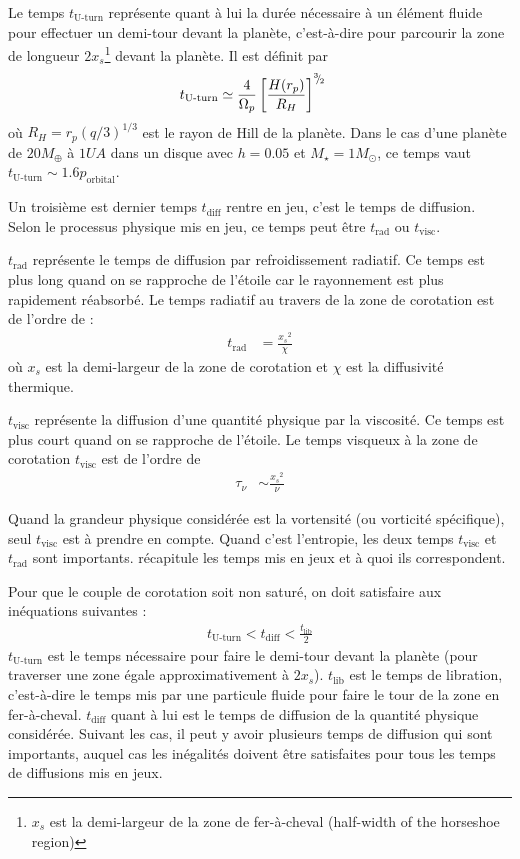 Le temps $t_\text{U-turn}$ représente quant à lui la durée nécessaire à un élément fluide pour effectuer un demi-tour devant la planète, c'est-à-dire pour parcourir la zone de longueur $2x_s$\footnote{$x_s$ est la demi-largeur de la zone de fer-à-cheval (\og half-width of the horseshoe region\fg)} devant la planète. Il est définit par \citep[eq. (64)]{baruteau2008corotation}
\begin{align}
t_\text{U-turn} &\simeq \frac{4}{\Omega_p}\left[\frac{H(r_p)}{R_H}\right]^{{}^{3\!\!}/ _{\!2}}
\end{align}
où $R_H=r_p (q/3)^{1/3}$ est le rayon de Hill de la planète. Dans le cas d'une planète de $20\unit{M_\oplus}$ à $1\unit{UA}$ dans un disque avec $h=0.05$ et $M_\star=1M_\odot$, ce temps vaut $t_\text{U-turn} \sim 1.6 p_\text{orbital}$.

Un troisième est dernier temps $t_\text{diff}$ rentre en jeu, c'est le temps de diffusion. Selon le processus physique mis en jeu, ce temps peut être $t_\text{rad}$ ou $t_\text{visc}$.

$t_\text{rad}$ représente le temps de diffusion par refroidissement radiatif. Ce temps est plus long quand on se rapproche de l'étoile car le rayonnement est plus rapidement réabsorbé. Le temps radiatif au travers de la zone de corotation est de l'ordre de :
\begin{align}
t_\text{rad} &= \frac{{x_s}^2}{\chi}
\end{align}
où $x_s$ est la demi-largeur de la zone de corotation et $\chi$ est la diffusivité thermique.
 
$t_\text{visc}$ représente la diffusion d'une quantité physique par la viscosité. Ce temps est plus court quand on se rapproche de l'étoile. Le temps visqueux à la zone de corotation $t_\text{visc}$ est  de l'ordre de \citep{masset2001coorbital, masset2002coorbital, ogilvie2003saturation}
\begin{align}
\tau_\nu &\sim \frac{{x_s}^2}{\nu}
\end{align}

Quand la grandeur physique considérée est la vortensité (ou vorticité spécifique), seul $t_\text{visc}$ est à prendre en compte. Quand c'est l'entropie, les deux temps $t_\text{visc}$ et $t_\text{rad}$ sont importants.  récapitule les temps mis en jeux et à quoi ils correspondent.

\bigskip

Pour que le couple de corotation soit non saturé, on doit satisfaire aux inéquations suivantes \citep[eq. (31)]{baruteau2013recent} :
\begin{align}
t_\text{U-turn} < t_\text{diff} < \frac{t_\text{lib}}{2}
\end{align}
$t_\text{U-turn}$ est le temps nécessaire pour faire le demi-tour devant la planète (pour traverser une zone égale approximativement à $2x_s$). $t_\text{lib}$ est le temps de libration, c'est-à-dire le temps mis par une particule fluide pour faire le tour de la zone en fer-à-cheval. $t_\text{diff}$ quant à lui est le temps de diffusion de la quantité physique considérée. Suivant les cas, il peut y avoir plusieurs temps de diffusion qui sont importants, auquel cas les inégalités doivent être satisfaites pour tous les temps de diffusions mis en jeux.

